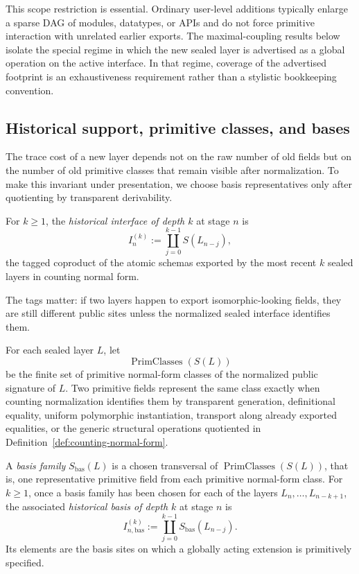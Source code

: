 \documentclass{lmcs}
\begin{document}
This scope restriction is essential.  Ordinary user-level additions typically enlarge a sparse
DAG of modules, datatypes, or APIs and do not force primitive interaction with unrelated
earlier exports.  The maximal-coupling results below isolate the special regime in which the
new sealed layer is advertised as a global operation on the active interface.  In that regime,
coverage of the advertised footprint is an exhaustiveness requirement rather than a stylistic
bookkeeping convention.

\subsection{Historical support, primitive classes, and bases}

The trace cost of a new layer depends not on the raw number of old fields but on the number
of old primitive classes that remain visible after normalization.  To make this invariant under
presentation, we choose basis representatives only after quotienting by transparent
derivability.

\begin{defi}
For \(k\geq 1\), the \emph{historical interface of depth \(k\)} at stage \(n\) is
\[
  I_n^{(k)} := \coprod_{j=0}^{k-1} S(L_{n-j}),
\]
the tagged coproduct of the atomic schemas exported by the most recent \(k\) sealed layers
in counting normal form.
\end{defi}

The tags matter: if two layers happen to export isomorphic-looking fields, they are still
different public sites unless the normalized sealed interface identifies them.

\begin{defi}
\label{def:primitive-bases}
For each sealed layer \(L\), let
\[
  \operatorname{PrimClasses}(S(L))
\]
be the finite set of primitive normal-form classes of the normalized public signature of
\(L\).  Two primitive fields represent the same class exactly when counting normalization
identifies them by transparent generation, definitional equality, uniform polymorphic
instantiation, transport along already exported equalities, or the generic structural
operations quotiented in Definition~\ref{def:counting-normal-form}.

A \emph{basis family} \(S_{\mathrm{bas}}(L)\) is a chosen transversal of
\(\operatorname{PrimClasses}(S(L))\), that is, one representative primitive field from each
primitive normal-form class.  For \(k\geq 1\), once a basis family has been chosen for each of
the layers \(L_n,\ldots,L_{n-k+1}\), the associated \emph{historical basis of depth \(k\)} at
stage \(n\) is
\[
  I_{n,\mathrm{bas}}^{(k)} := \coprod_{j=0}^{k-1} S_{\mathrm{bas}}(L_{n-j}).
\]
Its elements are the basis sites on which a globally acting extension is primitively specified.
\end{defi}
\end{document}
